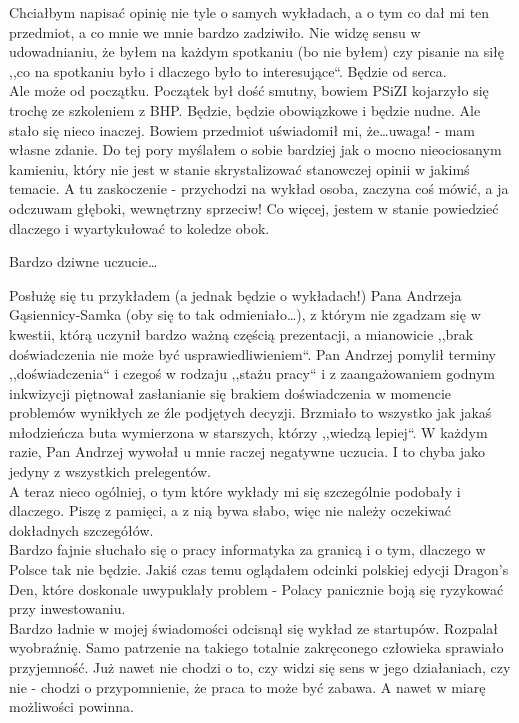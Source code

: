 \documentclass[a4paper,11pt]{article}
\begin{document}
Chciałbym napisać opinię nie tyle o samych wykładach, a o tym co dał mi ten przedmiot,
a co mnie we mnie bardzo zadziwiło. Nie widzę sensu w udowadnianiu, że
byłem na każdym spotkaniu (bo nie byłem) czy pisanie na siłę
 ,,co na spotkaniu było i dlaczego było to interesujące``.
Będzie od serca.
\\

Ale może od początku. Początek był dość smutny, bowiem PSiZI kojarzyło się
trochę ze szkoleniem z BHP. Będzie, będzie obowiązkowe i będzie nudne.
Ale stało się nieco inaczej. Bowiem przedmiot uświadomił mi, że\ldots uwaga!
- mam własne zdanie. Do tej pory myślałem o sobie bardziej jak o mocno
nieociosanym kamieniu, który nie jest w stanie skrystalizować stanowczej
opinii w jakimś temacie. A tu zaskoczenie - przychodzi na wykład osoba,
zaczyna coś mówić, a ja odczuwam głęboki, wewnętrzny sprzeciw! Co więcej,
jestem w stanie powiedzieć dlaczego i wyartykułować to koledze obok.

Bardzo dziwne uczucie\ldots

Posłużę się tu przykładem (a jednak będzie o wykładach!) Pana Andrzeja
Gąsiennicy-Samka (oby się to tak odmieniało\ldots), z którym nie zgadzam
się w kwestii, którą uczynił bardzo ważną częścią prezentacji, a mianowicie
,,brak doświadczenia nie może być usprawiedliwieniem``. Pan Andrzej
pomylił terminy ,,doświadczenia`` i czegoś w rodzaju ,,stażu pracy`` i z
zaangażowaniem godnym inkwizycji piętnował zasłanianie się brakiem doświadczenia
w momencie problemów wynikłych ze źle podjętych decyzji. Brzmiało to wszystko
jak jakaś młodzieńcza buta wymierzona w starszych, którzy ,,wiedzą lepiej``.
W każdym razie, Pan Andrzej wywołał u mnie raczej negatywne uczucia. I to chyba
jako jedyny z wszystkich prelegentów.
\\

A teraz nieco ogólniej, o tym które wykłady mi się szczególnie podobały i dlaczego.
Piszę z pamięci, a z nią bywa słabo, więc nie należy oczekiwać dokładnych szczegółów.
\\

Bardzo fajnie słuchało się o pracy informatyka za granicą i o tym, dlaczego
w Polsce tak nie będzie. Jakiś czas temu oglądałem odcinki polskiej edycji
Dragon's Den, które doskonale uwypuklały problem - Polacy panicznie boją się
ryzykować przy inwestowaniu.
\\

Bardzo ładnie w mojej świadomości odcisnął się wykład ze startupów. Rozpalał
wyobraźnię. Samo patrzenie na takiego totalnie zakręconego człowieka sprawiało
przyjemność. Już nawet nie chodzi o to, czy widzi się sens w jego działaniach,
czy nie - chodzi o przypomnienie, że praca to może być zabawa. A nawet w miarę
możliwości powinna.
\\
\end{document}

